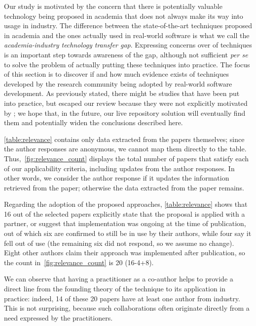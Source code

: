 Our study is motivated by the concern that there is potentially valuable technology being proposed in academia that does not always make its way into usage in industry.
The difference between the state-of-the-art techniques proposed in academia and the ones actually used in real-world software is what we call the \emph{academia-industry technology transfer gap}.
Expressing concerns over \rea of \rt techniques is an important step towards awareness of the gap, although not sufficient \textit{per se} to solve the problem of actually putting these techniques into practice.
The focus of this section is to discover if and how much evidence exists of techniques developed by the research community being adopted by real-world software development.
As previously stated, there might be studies that have been put into practice, but escaped our review because they were not explicitly motivated by \rea; we hope that, in the future, our live repository solution will eventually find them and potentially widen the conclusions described here.

\autoref{table:relevance} contains only data extracted from the papers themselves; since the author responses are anonymous, we cannot map them directly to the table.
Thus,~\autoref{fig:relevance_count} displays the total number of papers that satisfy each of our applicability criteria, including updates from the author responses.
In other words, we consider the author response if it updates the information retrieved from the paper; otherwise the data extracted from the paper remains.



Regarding the adoption of the proposed approaches, \autoref{table:relevance} shows that 16 out of the \numpapers selected papers explicitly state that the proposal is applied with a partner, or suggest that implementation was ongoing at the time of publication, out of which six are confirmed to still be in use by their authors, while four say it fell out of use (the remaining six did not respond, so we assume no change).
Eight other authors claim their approach was implemented after publication, so the count in~\autoref{fig:relevance_count} is 20 (16-4+8).

We can observe that having a practitioner as a co-author helps to provide a direct line from the founding theory of the technique to its application in practice: 
indeed, 14 of these 20 papers have at least one author from industry.
This is not surprising, because such collaborations often originate directly from a need expressed by the practitioners.

